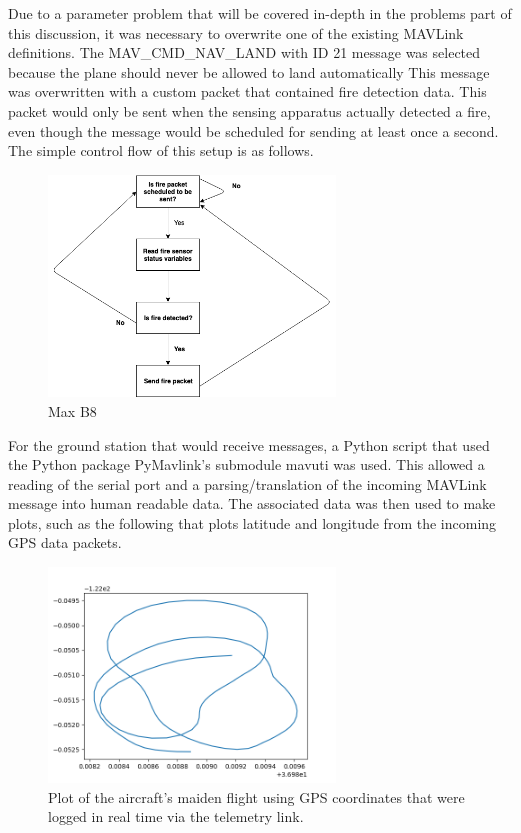 \documentclass[12pt,journal,compsoc]{IEEEtran}
\begin{document}
Due to a parameter problem that will be covered in-depth in the problems part of this discussion, it was necessary to overwrite one of the existing MAVLink definitions. The MAV\_CMD\_NAV\_LAND with ID 21 message was selected because the plane should never be allowed to land automatically This message was overwritten with a custom packet that contained fire detection data. This packet would only be sent when the sensing apparatus actually detected a fire, even though the message would be scheduled for sending at least once a second. The simple control flow of this setup is as follows.
\begin{figure}[h!]
\hspace*{0cm}
\centering
\includegraphics[width=3in]{Sending.png}
\caption{Max B8}
\label{sending}
\end{figure}

For the ground station that would receive messages, a Python script that used the Python package PyMavlink's submodule mavuti was used. This allowed a reading of the serial port and a parsing/translation of the incoming MAVLink message into human readable data. The associated data was then used to make plots, such as the following that plots latitude and longitude from the incoming GPS data packets.
\begin{figure}[h!]
\hspace*{0cm}
\centering
\includegraphics[width=3in]{flight02-22-2019_maiden.png}
\caption{Plot of the aircraft's maiden flight using GPS coordinates that were logged in real time via the telemetry link.}
\label{maidenFlightPlot}
\end{figure}
\end{document}

